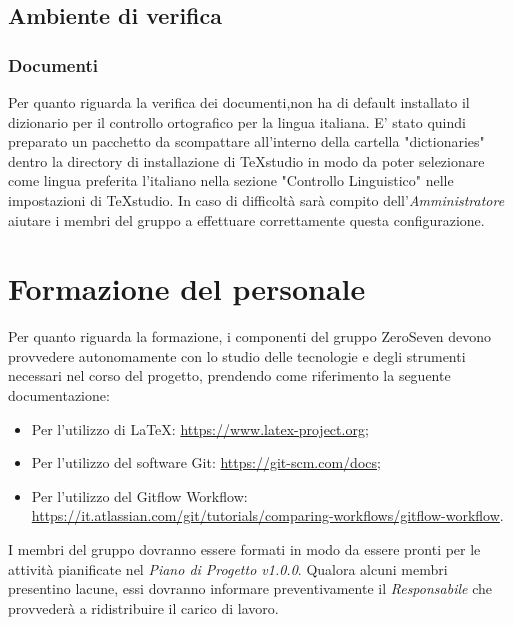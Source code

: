 \subsection{Ambiente di verifica}
\subsubsection{Documenti}
Per quanto riguarda la verifica dei documenti,non ha di default installato il dizionario per il controllo ortografico per la lingua italiana. E' stato quindi preparato un pacchetto da scompattare all'interno della cartella "dictionaries" dentro la directory di installazione di TeXstudio in modo da poter selezionare come lingua preferita l'italiano nella sezione "Controllo Linguistico" nelle impostazioni di TeXstudio.  In caso di difficoltà sarà compito dell'\textit{Amministratore} aiutare i membri del gruppo a effettuare correttamente questa configurazione.
\section{Formazione del personale}
Per quanto riguarda la formazione, i componenti del gruppo ZeroSeven devono provvedere autonomamente con lo studio delle tecnologie e degli strumenti necessari nel corso del progetto, prendendo come riferimento la seguente documentazione:
\begin{itemize}
	\item Per l'utilizzo di \LaTeX: \url{https://www.latex-project.org};
	\item Per l'utilizzo del software Git: \url{https://git-scm.com/docs};
	\item Per l'utilizzo del Gitflow Workflow: \url{https://it.atlassian.com/git/tutorials/comparing-workflows/gitflow-workflow}.
\end{itemize}
I membri del gruppo dovranno essere formati in modo da essere pronti per le attività pianificate nel \textit{Piano di Progetto v1.0.0}. Qualora alcuni membri presentino lacune, essi dovranno informare preventivamente il \textit{Responsabile} che provvederà a ridistribuire il carico di lavoro. 